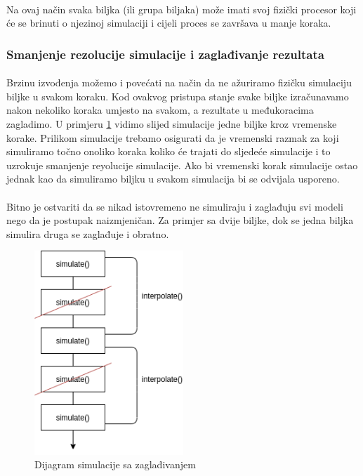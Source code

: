 \documentclass[times, utf8, diplomski]{fer}
\begin{document}
\paragraph{}
Na ovaj način svaka biljka (ili grupa biljaka) može imati svoj fizički procesor 
koji će se brinuti o njezinoj simulaciji i cijeli proces se završava u manje 
koraka.

\subsubsection{Smanjenje rezolucije simulacije i zaglađivanje rezultata}
\paragraph{}
Brzinu izvođenja možemo i povećati na način da ne ažuriramo fizičku simulaciju 
biljke u svakom koraku. Kod ovakvog pristupa stanje svake biljke izračunavamo 
nakon nekoliko koraka umjesto na svakom, a rezultate u međukoracima zagladimo.
U primjeru \ref{fig:531-2} vidimo slijed simulacije jedne biljke kroz vremenske 
korake. Prilikom simulacije trebamo osigurati da je vremenski razmak za koji 
simuliramo točno onoliko koraka koliko će trajati do sljedeće simulacije i to 
uzrokuje smanjenje reyolucije simulacije. Ako bi vremenski korak simulacije 
ostao jednak kao da simuliramo biljku u svakom simulacija bi se odvijala 
usporeno.
\paragraph{}
Bitno je ostvariti da se nikad istovremeno ne simuliraju i zaglađuju svi modeli 
nego da je postupak naizmjeničan. Za primjer sa dvije biljke, dok se jedna 
biljka simulira druga se zaglađuje i obratno.
\begin{figure}[h]
	\centering
	\includegraphics[width=0.5\textwidth]{img/531-2}
	\caption{Dijagram simulacije sa zaglađivanjem}
	\label{fig:531-2}
\end{figure}
\end{document}

